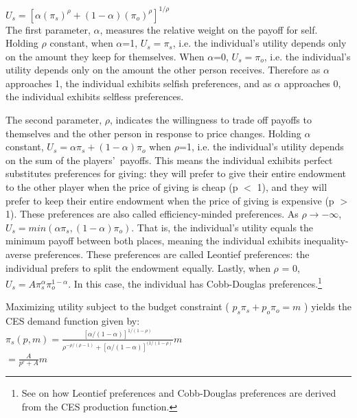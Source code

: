\documentclass[12pt]{article}
\begin{document}
\(U_{s} = [\alpha(\pi_{s})^{\rho} + (1-\alpha)(\pi_{o})^{\rho}]^{1/\rho}\) \\


The first parameter, \(\alpha\), measures the relative weight on the payoff for self. Holding \(\rho\) constant, when \(\alpha\)=1, \(U_{s} = \pi_{s}\), i.e. the individual\rq s utility depends only on the amount they keep for themselves. When \(\alpha\)=0, \(U_{s} = \pi_{o}\), i.e. the individual\rq s utility depends only on the amount the other person receives. Therefore as \(\alpha\) approaches 1, the individual exhibits selfish preferences, and as \(\alpha\) approaches 0, the individual exhibits selfless preferences.

The second parameter, \(\rho\), indicates the willingness to trade off payoffs to themselves and the other person in response to price changes. Holding \(\alpha\) constant, \(U_{s} = \alpha\pi_{s} + (1-\alpha)\pi_{o}\) when \(\rho\)=1,  i.e. the individual\rq s utility depends on the sum of the players\rq \ payoffs. This means the individual exhibits perfect substitutes preferences for giving: they will prefer to give their entire endowment to the other player when the price of giving is cheap (p $<$ 1), and they will prefer to keep their entire endowment when the price of giving is expensive (p $>$ 1). These preferences are also called efficiency-minded preferences. As \(\rho \rightarrow -\infty\), \(U_{s} = min(\alpha\pi_{s}, (1-\alpha)\pi_{o})\). That is, the individual\rq s utility equals the minimum payoff between both places, meaning the individual exhibits inequality-averse preferences. These preferences are called Leontief preferences: the individual prefers to split the endowment equally. Lastly, when \(\rho\) = 0, \(U_{s} = A\pi_{s}^{\alpha}\pi_{o}^{1-\alpha}\). In this case, the individual has Cobb-Douglas preferences.\footnote{See \cite{arrow_1961} on how Leontief preferences and Cobb-Douglas preferences are derived from the CES production function.}

Maximizing utility subject to the budget constraint ( \(p_{s}\pi_{s} + p_{o}\pi_{o}=m\) ) yields the CES demand function given by: \\
 

\(\pi_{s}(p,m)=\frac{[\alpha/(1-\alpha)]^{1/(1-\rho)}}{\rho^{-\rho/(\rho-1)}+[\alpha/(1-\alpha)]^{(1/(1-\rho)}}m\) \\

\hspace{14.5mm} \(= \frac{A}{p^{r}+A}m\) \\
 
\end{document}
